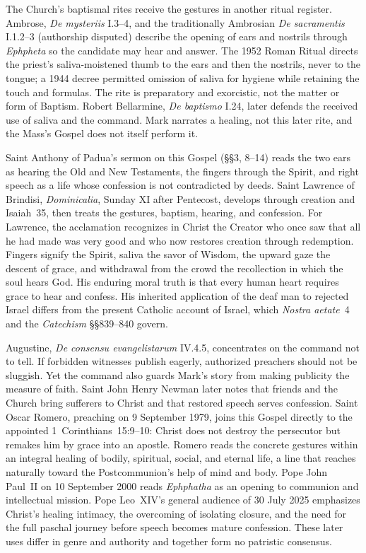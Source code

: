 The Church's baptismal rites receive the gestures in another ritual register.
Ambrose, \emph{De mysteriis} I.3--4, and the traditionally Ambrosian
\emph{De sacramentis} I.1.2--3 (authorship disputed) describe the opening of
ears and nostrils through \emph{Ephpheta} so the candidate may hear and answer.
The 1952 Roman Ritual directs the priest's saliva-moistened thumb to the ears
and then the nostrils, never to the tongue; a 1944 decree permitted omission
of saliva for hygiene while retaining the touch and formulas. The rite is
preparatory and exorcistic, not the matter or form of Baptism.
Robert Bellarmine, \emph{De baptismo} I.24, later defends the received use of
saliva and the command. Mark narrates a healing, not this later rite, and the
Mass's Gospel does not itself perform it.

Saint Anthony of Padua's sermon on this Gospel (§§3, 8--14) reads the two ears as hearing the Old
and New Testaments, the fingers through the Spirit, and right speech as a life
whose confession is not contradicted by deeds. Saint Lawrence of Brindisi,
\emph{Dominicalia}, Sunday XI after Pentecost, develops
 through creation and Isaiah~35, then treats the
gestures, baptism, hearing, and confession. For Lawrence, the acclamation
recognizes in Christ the Creator who once saw that all he had made was very
good and who now restores creation through redemption. Fingers signify the
Spirit, saliva the savor of Wisdom, the upward gaze the descent of grace, and
withdrawal from the crowd the recollection in which the soul hears God. His
enduring moral truth is that every human heart requires grace to hear and
confess. His inherited application of the deaf man to rejected Israel differs
from the present Catholic account of Israel, which \emph{Nostra aetate}~4 and
the \emph{Catechism} §§839--840 govern.

Augustine, \emph{De consensu evangelistarum} IV.4.5, concentrates on the
command not to tell. If forbidden witnesses publish eagerly, authorized
preachers should not be sluggish. Yet the command also guards Mark's story
from making publicity the measure of faith. Saint John Henry Newman later
notes that friends and the Church bring sufferers to Christ and that restored
speech serves confession. Saint Oscar Romero, preaching on 9 September 1979,
joins this Gospel directly to the appointed 1~Corinthians~15:9--10: Christ does
not destroy the persecutor but remakes him by grace into an apostle. Romero
reads the concrete gestures within an integral healing of bodily, spiritual,
social, and eternal life, a line that reaches naturally toward the
Postcommunion's help of mind and body. Pope John Paul~II on 10 September 2000 reads \emph{Ephphatha} as
an opening to communion and intellectual mission. Pope Leo~XIV's general
audience of 30 July 2025 emphasizes Christ's healing intimacy, the overcoming
of isolating closure, and the need for the full paschal journey before speech
becomes mature confession. These later uses differ in genre and authority
and together form no patristic consensus.

